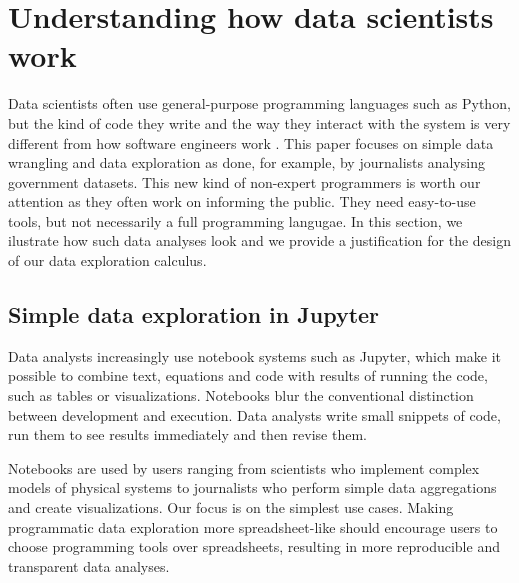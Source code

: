 \documentclass[english,submission]{programming}
\theoremstyle{plain}
\theoremstyle{definition}
\begin{document}

\section{Understanding how data scientists work}
\label{sec:background}

Data scientists often use general-purpose programming languages such as Python, but the kind of
code they write and the way they interact with the system is very different from how software
engineers work \cite{workflow}. This paper focuses on simple data wrangling and data exploration as
done, for example, by journalists analysing government datasets. This new kind of non-expert
programmers is worth our attention as they often work on informing the public. They need easy-to-use
tools, but not necessarily a full programming langugae. In this section, we ilustrate how such
data analyses look and we provide a justification for the design of our data exploration calculus.


\subsection{Simple data exploration in Jupyter}
\label{sec:background-jupyter}

Data analysts increasingly use notebook systems such as Jupyter, which make it possible to
combine text, equations and code with results of running the code, such as tables or visualizations.
Notebooks blur the conventional distinction between development and execution. Data analysts write
small snippets of code, run them to see results immediately and then revise them.

Notebooks are used by users ranging from scientists who implement complex models of physical
systems to journalists who perform simple data aggregations and create visualizations. Our
focus is on the simplest use cases. Making programmatic data exploration more
spreadsheet-like should encourage users to choose programming tools over spreadsheets, resulting
in more reproducible and transparent data analyses.
\end{document}
